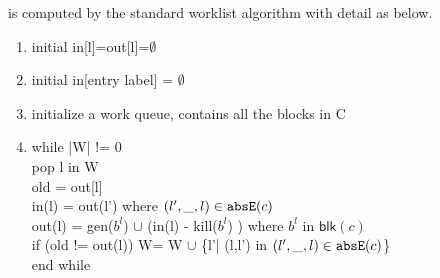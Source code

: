 \begin{enumerate}
is computed by the standard worklist algorithm with detail as below. 
\begin{enumerate}
    \item initial in[l]=out[l]=$\emptyset$
    \item initial in[entry label] = $\emptyset$
    \item initialize a work queue, contains all the blocks in C
    \item while |W| != 0 \\
         pop l in W\\
          old = out[l]\\
          in(l) =  out(l') where $(l',\_, l) \in \mathtt{abs}{\mathtt{E}}(c)$\\
           out(l) = gen($b^l$) $\cup$ (in(l) - kill($b^l$) ) where $b^l$ in $\mathsf{blk}(c)$   \\
          if (old != out(l)) W= W $\cup$ \{l'| (l,l') in $(l',\_, l) \in \mathtt{abs}{\mathtt{E}}(c)$\}\\
          end while
\end{enumerate}
\end{enumerate}
%
